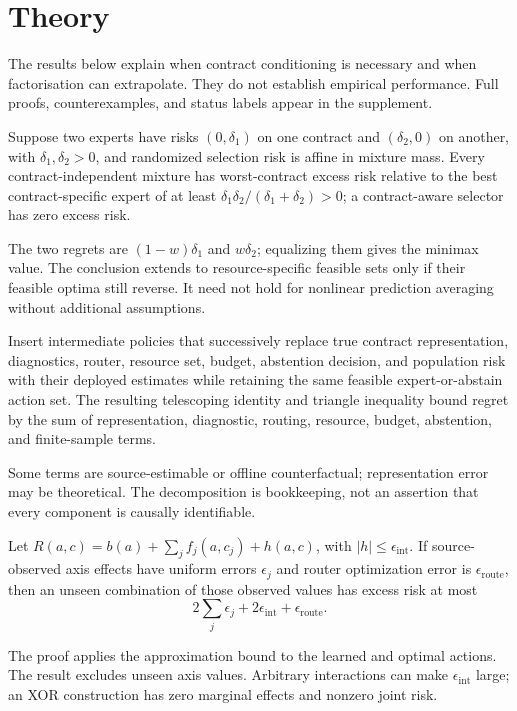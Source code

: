 \section{Theory}

The results below explain when contract conditioning is necessary and when factorisation can extrapolate. They do not establish empirical performance. Full proofs, counterexamples, and status labels appear in the supplement.

\begin{theorem}
Suppose two experts have risks \((0,\delta_1)\) on one contract and \((\delta_2,0)\) on another, with \(\delta_1,\delta_2>0\), and randomized selection risk is affine in mixture mass. Every contract-independent mixture has worst-contract excess risk relative to the best contract-specific expert of at least \(\delta_1\delta_2/(\delta_1+\delta_2)>0\); a contract-aware selector has zero excess risk.
\end{theorem}
The two regrets are \((1-w)\delta_1\) and \(w\delta_2\); equalizing them gives the minimax value. The conclusion extends to resource-specific feasible sets only if their feasible optima still reverse. It need not hold for nonlinear prediction averaging without additional assumptions.

\begin{proposition}
Insert intermediate policies that successively replace true contract representation, diagnostics, router, resource set, budget, abstention decision, and population risk with their deployed estimates while retaining the same feasible expert-or-abstain action set. The resulting telescoping identity and triangle inequality bound regret by the sum of representation, diagnostic, routing, resource, budget, abstention, and finite-sample terms.
\end{proposition}
Some terms are source-estimable or offline counterfactual; representation error may be theoretical. The decomposition is bookkeeping, not an assertion that every component is causally identifiable.

\begin{theorem}
Let \(R(a,c)=b(a)+\sum_jf_j(a,c_j)+h(a,c)\), with \(|h|\leq\epsilon_{\mathrm{int}}\). If source-observed axis effects have uniform errors \(\epsilon_j\) and router optimization error is \(\epsilon_{\mathrm{route}}\), then an unseen combination of those observed values has excess risk at most
\[
2\sum_j\epsilon_j+2\epsilon_{\mathrm{int}}+\epsilon_{\mathrm{route}}.
\]
\end{theorem}
The proof applies the approximation bound to the learned and optimal actions. The result excludes unseen axis values. Arbitrary interactions can make \(\epsilon_{\mathrm{int}}\) large; an XOR construction has zero marginal effects and nonzero joint risk.

